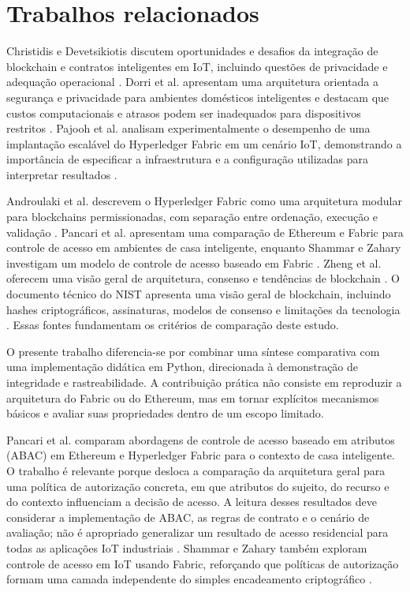 \documentclass[10pt,a4paper,twocolumn]{article}
\begin{document}
\section{Trabalhos relacionados}
Christidis e Devetsikiotis discutem oportunidades e desafios da integração de blockchain e contratos inteligentes em IoT, incluindo questões de privacidade e adequação operacional \cite{Christidis2016}. Dorri et al. apresentam uma arquitetura orientada a segurança e privacidade para ambientes domésticos inteligentes e destacam que custos computacionais e atrasos podem ser inadequados para dispositivos restritos \cite{Dorri2017}. Pajooh et al. analisam experimentalmente o desempenho de uma implantação escalável do Hyperledger Fabric em um cenário IoT, demonstrando a importância de especificar a infraestrutura e a configuração utilizadas para interpretar resultados \cite{Pajooh2022}.

Androulaki et al. descrevem o Hyperledger Fabric como uma arquitetura modular para blockchains permissionadas, com separação entre ordenação, execução e validação \cite{Androulaki2018}. Pancari et al. apresentam uma comparação de Ethereum e Fabric para controle de acesso em ambientes de casa inteligente, enquanto Shammar e Zahary investigam um modelo de controle de acesso baseado em Fabric \cite{Pancari2023,Shammar2022}. Zheng et al. oferecem uma visão geral de arquitetura, consenso e tendências de blockchain \cite{Zheng2017}. O documento técnico do NIST apresenta uma visão geral de blockchain, incluindo hashes criptográficos, assinaturas, modelos de consenso e limitações da tecnologia \cite{Yaga2018}. Essas fontes fundamentam os critérios de comparação deste estudo.

O presente trabalho diferencia-se por combinar uma síntese comparativa com uma implementação didática em Python, direcionada à demonstração de integridade e rastreabilidade. A contribuição prática não consiste em reproduzir a arquitetura do Fabric ou do Ethereum, mas em tornar explícitos mecanismos básicos e avaliar suas propriedades dentro de um escopo limitado.


Pancari et al. comparam abordagens de controle de acesso baseado em atributos (ABAC) em Ethereum e Hyperledger Fabric para o contexto de casa inteligente. O trabalho é relevante porque desloca a comparação da arquitetura geral para uma política de autorização concreta, em que atributos do sujeito, do recurso e do contexto influenciam a decisão de acesso. A leitura desses resultados deve considerar a implementação de ABAC, as regras de contrato e o cenário de avaliação; não é apropriado generalizar um resultado de acesso residencial para todas as aplicações IoT industriais \cite{Pancari2023}. Shammar e Zahary também exploram controle de acesso em IoT usando Fabric, reforçando que políticas de autorização formam uma camada independente do simples encadeamento criptográfico \cite{Shammar2022}.
\end{document}
